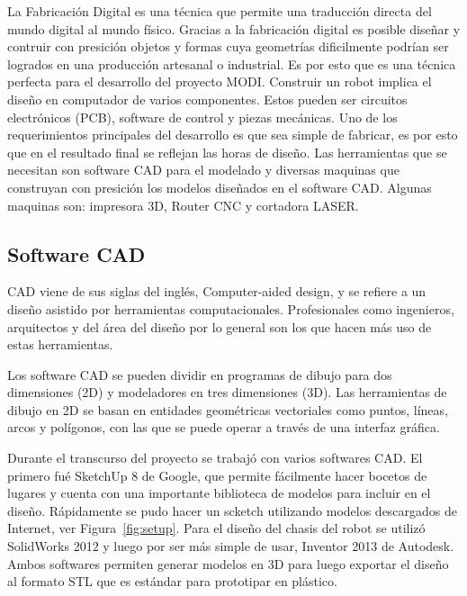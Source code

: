 La Fabricación Digital es una técnica que permite una traducción directa del mundo digital al mundo físico. Gracias a la fabricación digital es posible diseñar y contruir con presición objetos y formas cuya geometrías dificilmente podrían ser logrados en una producción artesanal o industrial. Es por esto que es una técnica perfecta para el desarrollo del proyecto MODI. Construir un robot implica el diseño en computador de varios componentes. Estos pueden ser circuitos electrónicos (PCB), software de control y piezas mecánicas. Uno de los requerimientos principales del desarrollo es que sea simple de fabricar, es por esto que en el resultado final se reflejan las horas de diseño. Las herramientas que se necesitan son software CAD para el modelado y diversas maquinas que construyan con presición los modelos diseñados en el software CAD. Algunas maquinas son: impresora 3D, Router CNC y cortadora LASER.




\subsection{Software CAD}

CAD viene de sus siglas del inglés, Computer-aided design, y se refiere a un diseño asistido por herramientas computacionales. Profesionales como ingenieros, arquitectos y del área del diseño por lo general son los que hacen más uso de estas herramientas.

Los software CAD se pueden dividir en programas de dibujo para dos dimensiones (2D) y modeladores en tres dimensiones (3D). Las herramientas de dibujo en 2D se basan en entidades geométricas vectoriales como puntos, líneas, arcos y polígonos, con las que se puede operar a través de una interfaz gráfica.

Durante el transcurso del proyecto se trabajó con varios softwares CAD. El primero fué SketchUp 8 de Google, que permite fácilmente hacer bocetos de lugares y cuenta con una importante biblioteca de modelos para incluir en el diseño. Rápidamente se pudo hacer un scketch utilizando modelos descargados de Internet, ver Figura~\ref{fig:setup}. Para el diseño del chasis del robot se utilizó SolidWorks 2012 y luego por ser más simple de usar, Inventor 2013 de Autodesk. Ambos softwares permiten generar modelos en 3D para luego exportar el diseño al formato STL que es estándar para prototipar en plástico. 





